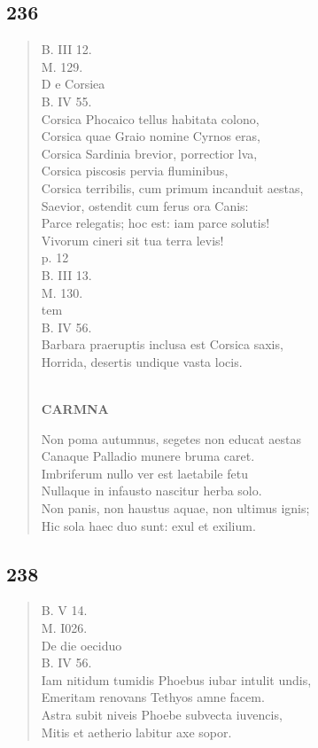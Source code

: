 \documentclass[11pt, a4paper]{report}
\begin{document}
            \subsection*{236}
      \begin{verse}
      B. III 12. \\ M. 129. \\ D e Corsiea \\ B. IV 55. \\ Corsica Phocaico tellus habitata colono, \\ Corsica quae Graio nomine Cyrnos eras, \\ Corsica Sardinia brevior, porrectior lva, \\ Corsica piscosis pervia fluminibus, \\ Corsica terribilis, cum primum incanduit aestas, \\ Saevior, ostendit cum ferus ora Canis: \\ Parce relegatis; hoc est: iam parce solutis! \\ Vivorum cineri sit tua terra levis! \\ p. 12 \\ B. III 13. \\ M. 130. \\  \lbrack tem \rbrack  \\ B. IV 56. \\ Barbara praeruptis inclusa est Corsica saxis, \\ Horrida, desertis undique vasta locis. \\ 
        ﻿\pagebreak 
     \marginpar{[196]} \begin{center} \textbf{CARMNA} \end{center}Non poma autumnus, segetes non educat aestas \\ Canaque Palladio munere bruma caret. \\ Imbriferum nullo ver est laetabile fetu \\ Nullaque in infausto nascitur herba solo. \\ Non panis, non haustus aquae, non ultimus ignis; \\ Hic sola haec duo sunt: exul et exilium. \\ 
      \end{verse}
  
            \subsection*{238}
      \begin{verse}
      B. V 14. \\ M. I026. \\ De  \lbrack die oeciduo \\ B. IV 56. \\ Iam nitidum tumidis Phoebus iubar intulit undis, \\ Emeritam renovans Tethyos amne facem. \\ Astra subit niveis Phoebe subvecta iuvencis, \\ Mitis et aetherio labitur axe sopor. \\ 
      \end{verse}
  
\end{document}
